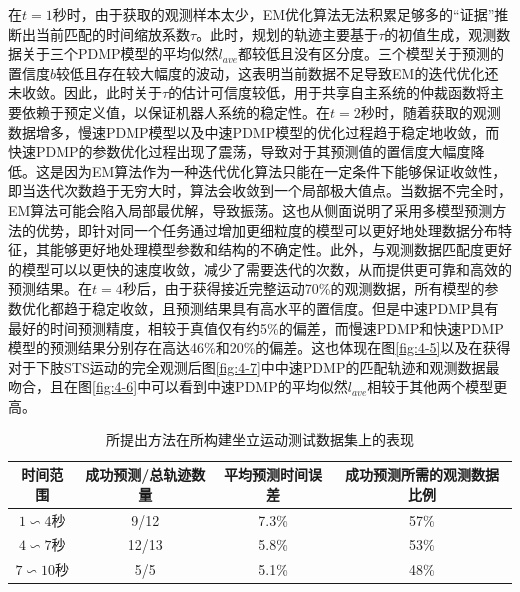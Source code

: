 在$t=1$秒时，由于获取的观测样本太少，EM优化算法无法积累足够多的``证据''推断出当前匹配的时间缩放系数$\tau$。此时，规划的轨迹主要基于$\tau$的初值生成，观测数据关于三个PDMP模型的平均似然$l_{ave}$都较低且没有区分度。三个模型关于预测的置信度$b$较低且存在较大幅度的波动，这表明当前数据不足导致EM的迭代优化还未收敛。因此，此时关于$\tau$的估计可信度较低，用于共享自主系统的仲裁函数将主要依赖于预定义值，以保证机器人系统的稳定性。在$t=2$秒时，随着获取的观测数据增多，慢速PDMP模型以及中速PDMP模型的优化过程趋于稳定地收敛，而快速PDMP的参数优化过程出现了震荡，导致对于其预测值的置信度大幅度降低。这是因为EM算法作为一种迭代优化算法只能在一定条件下能够保证收敛性，即当迭代次数趋于无穷大时，算法会收敛到一个局部极大值点。当数据不完全时，EM算法可能会陷入局部最优解，导致振荡。这也从侧面说明了采用多模型预测方法的优势，即针对同一个任务通过增加更细粒度的模型可以更好地处理数据分布特征，其能够更好地处理模型参数和结构的不确定性。此外，与观测数据匹配度更好的模型可以以更快的速度收敛，减少了需要迭代的次数，从而提供更可靠和高效的预测结果。在$t=4$秒后，由于获得接近完整运动70\%的观测数据，所有模型的参数优化都趋于稳定收敛，且预测结果具有高水平的置信度。但是中速PDMP具有最好的时间预测精度，相较于真值仅有约5\%的偏差，而慢速PDMP和快速PDMP模型的预测结果分别存在高达46\%和20\%的偏差。这也体现在图\ref{fig:4-5}以及在获得对于下肢STS运动的完全观测后图\ref{fig:4-7}中中速PDMP的匹配轨迹和观测数据最吻合，且在图\ref{fig:4-6}中可以看到中速PDMP的平均似然$l_{ave}$相较于其他两个模型更高。
\begin{table}[htb]
    \centering
    \caption{所提出方法在所构建坐立运动测试数据集上的表现}
    \setlength{\tabcolsep}{5pt}
    \begin{tabular}{c c c c}
    \hline\hline
     时间范围 & 成功预测/总轨迹数量 & 平均预测时间误差 & 成功预测所需的观测数据比例\\  
    \hline
    $1\backsim 4$秒& 9/12 & 7.3\%& 57\%\\ 
    $4\backsim 7$秒& 12/13 & 5.8\%& 53\%\\ 
    $7\backsim 10$秒& 5/5 & 5.1\%& 48\%\\ 
    \hline\hline
    \end{tabular}
    \label{tab:4-1}
\end{table}    

